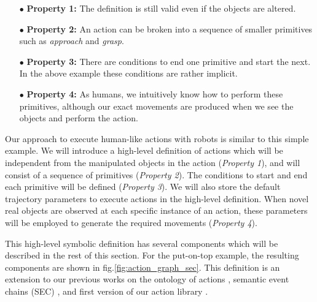 \begin{itemize}
  \item[$\bullet$] \textbf{Property 1:} The definition is still valid even if the objects are altered.
  \item[$\bullet$] \textbf{Property 2:} An action can be broken into a sequence of smaller primitives such as \textit{approach} and \textit{grasp}.
  \item[$\bullet$] \textbf{Property 3:} There are conditions to end one primitive and start the next. In the above example these conditions are rather implicit.
  \item[$\bullet$] \textbf{Property 4:} As humans, we intuitively know how to  perform these primitives, although our exact movements are produced when we see the objects and perform the action.
\end{itemize}


Our approach to execute human-like actions with robots is similar to this simple example.
We will introduce a high-level definition of actions which will be independent from the manipulated objects in the action ({\it Property 1}),
and will consist of a sequence of primitives ({\it Property 2}).
The conditions to start and end each primitive will be defined %
 ({\it Property 3}).
We will also store the default trajectory parameters to execute actions in the high-level definition.
When novel real objects are observed at each specific instance of an action, these parameters will be employed to generate the required movements ({\it Property 4}).


This high-level symbolic definition has several components which will be described in the rest of this section.
For the put-on-top example, the resulting components are shown in fig.\ref{fig:action_graph_sec}.
This definition is an extension to our previous works on the ontology of actions \cite{TAMD13}, semantic event chains (SEC) \cite{Aksoy2011b},
and first version of our action library \cite{aein2013toward}.


